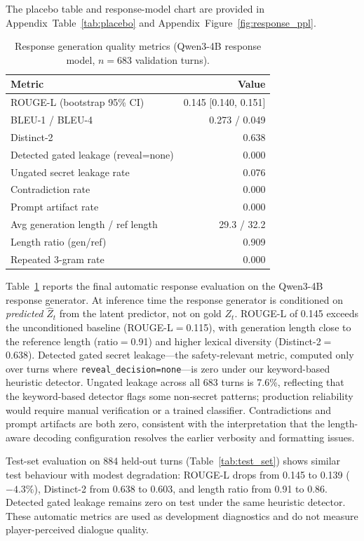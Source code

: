 \documentclass[11pt]{article}
\begin{document}
The placebo table and response-model chart are provided in Appendix~Table~\ref{tab:placebo} and Appendix~Figure~\ref{fig:response_ppl}.

\begin{table}[t]
\centering
\caption{Response generation quality metrics (Qwen3-4B response model, $n=683$ validation turns).}
\label{tab:response_quality}
\small
\begin{tabularx}{\linewidth}{@{}Xr@{}}
\toprule
\textbf{Metric} & \textbf{Value} \\
\midrule
ROUGE-L (bootstrap 95\% CI) & 0.145 [0.140, 0.151] \\
BLEU-1 / BLEU-4 & 0.273 / 0.049 \\
Distinct-2 & 0.638 \\
Detected gated leakage (reveal=none) & 0.000 \\
Ungated secret leakage rate & 0.076 \\
Contradiction rate & 0.000 \\
Prompt artifact rate & 0.000 \\
Avg generation length / ref length & 29.3 / 32.2 \\
Length ratio (gen/ref) & 0.909 \\
Repeated 3-gram rate & 0.000 \\
\bottomrule
\end{tabularx}
\end{table}

Table~\ref{tab:response_quality} reports the final automatic response evaluation on the Qwen3-4B response generator.
At inference time the response generator is conditioned on \textit{predicted} $\hat{Z}_t$ from the latent predictor, not on gold $Z_t$.
ROUGE-L of 0.145 exceeds the unconditioned baseline (ROUGE-L$=$0.115), with generation length close to the reference length (ratio$=$0.91) and higher lexical diversity (Distinct-2$=$0.638).
Detected gated secret leakage---the safety-relevant metric, computed only over turns where \texttt{reveal\_decision=none}---is zero under our keyword-based heuristic detector.
Ungated leakage across all 683 turns is 7.6\%, reflecting that the keyword-based detector flags some non-secret patterns; production reliability would require manual verification or a trained classifier.
Contradictions and prompt artifacts are both zero, consistent with the interpretation that the length-aware decoding configuration resolves the earlier verbosity and formatting issues.

Test-set evaluation on 884 held-out turns (Table~\ref{tab:test_set}) shows similar test behaviour with modest degradation: ROUGE-L drops from 0.145 to 0.139 ($-4.3\%$), Distinct-2 from 0.638 to 0.603, and length ratio from 0.91 to 0.86. Detected gated leakage remains zero on test under the same heuristic detector.
These automatic metrics are used as development diagnostics and do not measure player-perceived dialogue quality.
\end{document}
